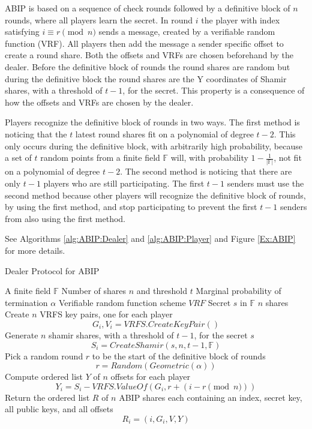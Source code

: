\documentclass{dalcsthesis}
\begin{document}
ABIP is based on a sequence of check rounds followed by a definitive block of $n$ rounds, where all players learn the secret. In round $i$ the player with index satisfying $i \equiv r \pmod{n}$ sends a message, created by a verifiable random function (VRF). All players then add the message a sender specific offset to create a round share. Both the offsets and VRFs are chosen beforehand by the dealer. Before the definitive block of rounds the round shares are random but during the definitive block the round shares are the Y coordinates of Shamir shares, with a threshold of $t-1$, for the secret. This property is a consequence of how the offsets and VRFs are chosen by the dealer.

Players recognize the definitive block of rounds in two ways. The first method is noticing that the $t$ latest round shares fit on a polynomial of degree $t-2$. This only occurs during the definitive block, with arbitrarily high probability, because a set of $t$ random points from a finite field $\mathbb{F}$ will, with probability $1 - \frac{1}{|\mathbb{F}|}$, not fit on a polynomial of degree $t-2$. The second method is noticing that there are only $t-1$ players who are still participating. The first $t-1$ senders must use the second method because other players will recognize the definitive block of rounds, by using the first method, and stop participating to prevent the first $t-1$ senders from also using the first method.

See Algorithms \ref{alg:ABIP:Dealer} and \ref{alg:ABIP:Player} and Figure \ref{Ex:ABIP} for more details.

\begin{algorithm}
  \caption{Dealer Protocol for ABIP}
  \label{alg:ABIP:Dealer}
  \begin{algorithmic}
    \INPUT A finite field $\mathbb{F}$
    \INPUT Number of shares $n$ and threshold $t$
    \INPUT Marginal probability of termination $\alpha$
    \INPUT Verifiable random function scheme $VRF$
    \INPUT Secret $s$ in $\mathbb{F}$
    \OUTPUT $n$ shares
    \STATE Create $n$ VRFS key pairs, one for each player
    	$$G_i, V_i = VRFS.CreateKeyPair()$$
    \STATE Generate $n$ shamir shares, with a threshold of $t-1$, for the secret $s$
    	$$S_i = CreateShamir(s, n, t - 1, \mathbb{F})$$
    \STATE Pick a random round $r$ to be the start of the definitive block of rounds
        $$r = Random(Geometric(\alpha))$$
    \STATE Compute ordered list $Y$ of $n$ offsets for each player
    	$$Y_i = S_i - VRFS.ValueOf(G_i, r+(i - r \pmod{n}))$$
    \STATE Return the ordered list $R$ of $n$ ABIP shares each containing an index, secret key, all public keys, and all offsets 
    	$$R_i = (i, G_i, V, Y)$$
  \end{algorithmic}
\end{algorithm}
\end{document}
